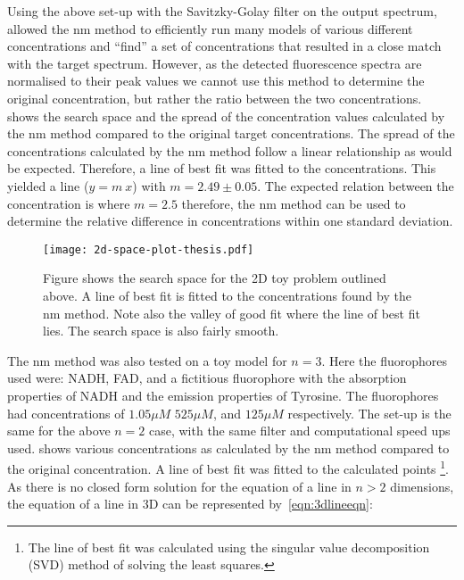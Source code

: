 Using the above set-up with the Savitzky-Golay filter on the output spectrum, allowed the \gls*{nm} method to efficiently run many models of various different concentrations and ``find'' a set of concentrations that resulted in a close match with the target spectrum.
However, as the detected fluorescence spectra are normalised to their peak values we cannot use this method to determine the original concentration, but rather the ratio between the two concentrations.
 shows the search space and the spread of the concentration values calculated by the \gls*{nm} method compared to the original target concentrations.
The spread of the concentrations calculated by the \gls*{nm} method follow a linear relationship as would be expected.
Therefore, a line of best fit was fitted to the concentrations.
This yielded a line ($y=m\ x$) with $m=2.49\pm0.05$.
The expected relation between the concentration is where $m =2.5$ therefore, the \gls*{nm} method can be used to determine the relative difference in concentrations within one standard deviation.


\begin{figure}[!htpb]
  \centering
  \texttt{[image: 2d-space-plot-thesis.pdf]}
  \caption{Figure shows the search space for the 2D toy problem outlined above. A line of best fit is fitted to the concentrations found by the \gls*{nm} method. Note also the valley of good fit where the line of best fit lies. The search space is also fairly smooth.}
  \label{fig:spaceplot2D}

\end{figure}


The \gls*{nm} method was also tested on a toy model for $n=3$.
Here the fluorophores used were: NADH, FAD, and a fictitious fluorophore with the absorption properties of NADH and the emission properties of Tyrosine.
The fluorophores had concentrations of $1.05\mu M$ $525\mu M$, and $125\mu M$ respectively.
The set-up is the same for the above $n=2$ case, with the same filter and computational speed ups used.
 shows various concentrations as calculated by the \gls*{nm} method compared to the original concentration.
A line of best fit was fitted to the calculated points \footnote{The line of best fit was calculated using the singular value decomposition (SVD) method of solving the least squares.}.
As there is no closed form solution for the equation of a line in $n>2$ dimensions, the equation of a line in 3D can be represented by~\cref{eqn:3dlineeqn}:

